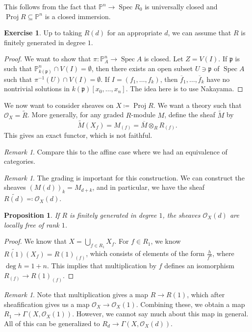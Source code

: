 \documentclass[leqno, openany]{memoir}
\newtheorem{prop}[thm]{Proposition}
\theoremstyle{definition}
\newtheorem{exer}[thm]{Exercise}
\theoremstyle{remark}
\newtheorem{rmk}[thm]{Remark}
\theoremstyle{plain}
\theoremstyle{definition}
\theoremstyle{remark}
\renewcommand{\P}{\mathbb{P}}
\newcommand{\M}{\overline{M}}
\newcommand{\mc}[1]{\mathcal{#1}}
\newcommand{\mf}[1]{\mathfrak{#1}}
\newcommand{\ol}[1]{\overline{#1}}
\newcommand{\wt}[1]{\widetilde{#1}}
\DeclareMathOperator{\Spec}{Spec}
\DeclareMathOperator{\Proj}{Proj}
\begin{document}
This follows from the fact that $\P^n \to \Spec R_0$ is universally closed and $\Proj R \subseteq \P^n$ is a closed immersion.

\begin{exer}
    Up to taking $R(d)$ for an appropriate $d$, we can assume that $R$ is finitely generated in degree $1$.
\end{exer}

\begin{proof}
    We want to show that $\pi \colon \P^n_A \to \Spec A$ is closed. Let $Z = V(I)$. If $\mf{p}$ is such that $\P^n_{k(\mf{p})} \cap V(I) = \emptyset$, then there exists an open subset $U \ni \mf{p}$ of $\Spec A$ such that $\pi^{-1}(U) \cap V(I) = \emptyset$. If $I = (f_1, \ldots, f_k)$, then $\ol{f}_1, \ldots, \ol{f}_k$ have no nontrivial solutions in $k(\mf{p})[x_0, \ldots, x_n]$. The idea here is to use Nakayama.
\end{proof}

We now want to consider sheaves on $X \coloneqq \Proj R$. We want a theory such that $\mc{O}_X = \wt{R}$. More generally, for any graded $R$-module $M$, define the sheaf $\wt{M}$ by
\[ \wt{M}(X_f) = M_{(f)} = \M \otimes_R R_{(f)}. \]
This gives an exact functor, which is not faithful.

\begin{rmk}
    Compare this to the affine case where we had an equivalence of categories. 
\end{rmk}

\begin{rmk}
    The grading is important for this construction. We can construct the sheaves ${(M(d))}_k = M_{d+k}$, and in particular, we have the sheaf $\wt{R(d)} \eqqcolon \mc{O}_X(d)$.
\end{rmk}

\begin{prop}
    If $R$ is finitely generated in degree $1$, the sheaves $\mc{O}_X(d)$ are locally free of rank $1$.
\end{prop}

\begin{proof}
    We know that $X = \bigcup_{f \in R_1} X_f$. For $f \in R_1$, we know $\wt{R(1)}(X_f) = {R(1)}_(f)$, which consists of elements of the form $\frac{h}{f^n}$, where $\deg h = 1+n$. This implies that multiplication by $f$ defines an isomorphism $R_{(f)} \to {R(1)}_{(f)}$.
\end{proof}

\begin{rmk}
    Note that multiplication gives a map $R \to R(1)$, which after sheafification gives us a map $\mc{O}_X \to \mc{O}_X(1)$. Combining these, we obtain a map $R_1 \to \Gamma(X, \mc{O}_X(1))$. However, we cannot say much about this map in general. All of this can be generalized to $R_d \to \Gamma(X, \mc{O}_X(d))$.
\end{rmk}
\end{document}
